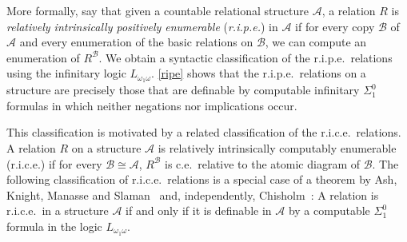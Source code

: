 \documentclass[11pt]{amsart}
\newcommand{\A}{{\mathcal{A}}}
\newcommand{\B}{{\mathcal{B}}}
\begin{document}
More formally, say that given a countable relational structure $\A$, a relation $R$ is \emph{relatively intrinsically positively enumerable} (\emph{r.i.p.e.}) in $\A$ if for every copy $\B$ of $\A$ and every enumeration of the basic relations on $\B$, we can compute an enumeration of $R^\B$.
We obtain a syntactic classification of the r.i.p.e.\ relations using the infinitary logic $L_{\omega_1\omega}$. \cref{ripe} shows that the r.i.p.e.\ relations on a structure are precisely those that are definable by computable infinitary $\Sigma_1^0$ formulas in which neither negations nor implications occur.

This classification is motivated by a related classification of the r.i.c.e.\ relations. A relation $R$ on a structure $\A$ is relatively intrinsically computably enumerable (r.i.c.e.) if for every $\B\cong \A$, $R^\B$ is c.e.\ relative to the atomic diagram of $\B$.
The following classification of r.i.c.e.\ relations is a special case of a theorem by Ash, Knight, Manasse and Slaman~\cite{ash1989} and, independently, Chisholm~\cite{chisholm1990}: A relation is r.i.c.e.\ in a structure $\A$ if and only if it is definable in $\A$ by a computable $\Sigma^0_1$ formula in the logic $L_{\omega_1\omega}$.%
\end{document}
